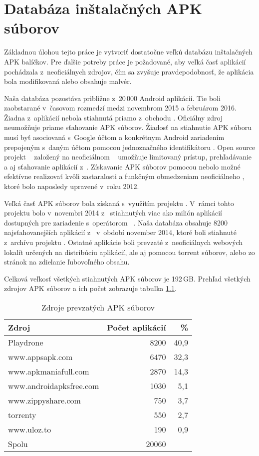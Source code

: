\chapter{Databáza inštalačných APK súborov}
Základnou úlohou tejto práce je vytvoriť dostatočne veľkú databázu inštalačných APK balíčkov. Pre ďalšie potreby práce je požadované, aby veľká časť aplikácií pochádzala z~neoficiálnych zdrojov, čím sa zvyšuje pravdepodobnosť, že aplikácia bola modifikovaná alebo obsahuje malvér.

Naša databáza pozostáva približne z~20\,000 Android aplikácií. Tie boli zaobstarané v~časovom rozmedzí medzi novembrom 2015 a februárom 2016. Žiadna z~aplikácií nebola stiahnutá priamo z~obchodu . Oficiálny zdroj  neumožňuje priame sťahovanie APK súborov. Žiadosť na stiahnutie APK súboru musí byť asociovaná s~Google účtom a konkrétnym Android zariadením prepojeným s~daným účtom pomocou jednoznačného identifikátoru . Open source projekt ~\cite{gpCrawler} založený na neoficiálnom ~\cite{gpApi} umožňuje limitovaný prístup, prehľadávanie a aj sťahovanie aplikácií z~. Získavanie APK súborov pomocou  nebolo možné efektívne realizovať kvôli zastaralosti a funkčným obmedzeniam neoficiálneho , ktoré bolo naposledy upravené v~roku 2012.

Veľká časť APK súborov bola získaná s~využitím projektu . V~rámci tohto projektu bolo v~novembri 2014 z~ stiahnutých viac ako milión aplikácií dostupných pre zariadenie  s~operátorom ~\cite{Viennot2014}. Naša databáza obsahuje 8200 najsťahovanejších aplikácií z~ v~období november 2014, ktoré boli stiahnuté z~archívu projektu . Ostatné aplikácie boli prevzaté z~neoficiálnych webových lokalít určených na distribúciu aplikácií, ale aj pomocou torrent súborov, alebo zo stránok na zdielanie ľubovoľného obsahu.

Celková veľkosť všetkých stiahnutých APK súborov je 192\,GB. Prehľad všetkých zdrojov APK súborov a ich počet zobrazuje tabuľka \ref{tab:stahovanie}. 

\begin{table}[htb]
\centering
  \begin{tabular}{|l r r|}
    \hline
    \textbf{Zdroj} & \textbf{Počet aplikácií} & \textbf{\%} \\\hline\hline
    Playdrone & 8200 & 40,9\\
    www.appsapk.com & 6470 & 32,3\\
    www.apkmaniafull.com & 2870 & 14,3\\
    www.androidapksfree.com & 1030 & 5,1\\
    www.zippyshare.com & 750 & 3,7\\
    torrenty & 550 & 2,7\\
    www.uloz.to & 190 & 0,9\\
    \midrule\hline
    Spolu & 20060 & \\
    \hline
  \end{tabular}
  \caption{Zdroje prevzatých APK súborov}
  \label{tab:stahovanie}
\end{table}


